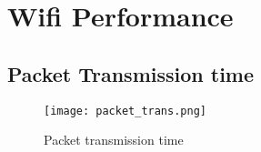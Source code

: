 \chapter{Wifi Performance}
\section{Packet Transmission time}
\begin{figure}[htbp]
    \centering
    \texttt{[image: packet\_trans.png]}
    \caption{Packet transmission time}
    \label{pkt_transmission}
\end{figure}
